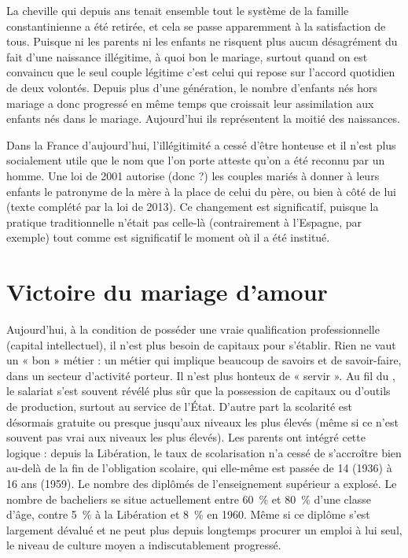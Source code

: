 La cheville qui depuis  ans tenait ensemble tout le système de la famille constantinienne a été retirée, et cela se passe apparemment à la satisfaction de tous. Puisque ni les parents ni les enfants ne risquent plus aucun désagrément du fait d'une naissance illégitime, à quoi bon le mariage, surtout quand on est convaincu que le seul couple légitime c'est celui qui repose sur l'accord quotidien de deux volontés. Depuis plus d'une génération, le nombre d'enfants nés hors mariage a donc progressé en même temps que croissait leur assimilation aux enfants nés dans le mariage. Aujourd'hui ils représentent la moitié des naissances. 

 Dans la France d'aujourd'hui, l'illégitimité a cessé d'être honteuse et il n'est plus socialement utile que le nom que l'on porte atteste qu'on a été reconnu par un homme. Une loi de 2001 autorise (donc ?) les couples mariés à donner à leurs enfants le patronyme de la mère à la place de celui du père, ou bien à côté de lui (texte complété par la loi  de 2013). Ce changement est significatif, puisque la pratique traditionnelle n'était pas celle-là (contrairement à l'Espagne, par exemple) tout comme est significatif le moment où il a été institué. 


 
 \section{Victoire du mariage d'amour}


 
 Aujourd'hui, à la condition de posséder une vraie qualification professionnelle (capital intellectuel), il n'est plus besoin de capitaux pour s'établir. Rien ne vaut un « bon » métier : un métier qui implique beaucoup de savoirs et de savoir-faire, dans un secteur d'activité porteur. Il n'est plus honteux de « servir ». Au fil du , le salariat s'est souvent révélé plus sûr que la possession de capitaux ou d'outils de production, surtout au service de l'État. D'autre part la scolarité est désormais gratuite ou presque jusqu'aux niveaux les plus élevés (même si ce n'est souvent pas vrai aux niveaux les plus élevés). Les parents ont intégré cette logique : depuis la Libération, le taux de scolarisation n'a cessé de s'accroître bien au-delà de la fin de l'obligation scolaire, qui elle-même est passée de 14 (1936) à 16 ans (1959). Le nombre des diplômés de l'enseignement supérieur a explosé. Le nombre de bacheliers se situe actuellement entre 60~\% et 80~\% d'une classe d'âge, contre 5~\% à la Libération et 8~\% en 1960. Même si ce diplôme s'est largement dévalué et ne peut plus depuis longtemps procurer un emploi à lui seul, le niveau de culture moyen a indiscutablement progressé. 

